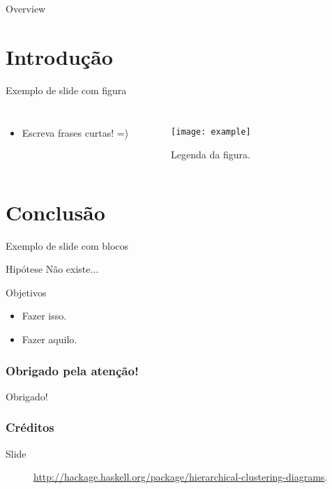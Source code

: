 
\begin{frame}
\titlepage
\end{frame}

\begin{frame}{Overview}
  \tableofcontents
\end{frame}

\section{Introdução}

\begin{frame}{Exemplo de slide com figura}
  \begin{columns}
    \begin{itemize}
    \item Escreva frases curtas! =)
    \end{itemize}

    \begin{figure}
      \texttt{[image: example]}
      \caption{Legenda da figura.}
      \label{fig:exemplo}
    \end{figure}
  \end{columns}
\end{frame}

\section{Conclusão}

\begin{frame}{Exemplo de slide com blocos}
  \begin{block}{Hipótese}
    Não existe...
  \end{block}

  \begin{block}{Objetivos}
    \begin{itemize}
    \item Fazer isso.
    \item Fazer aquilo.
    \end{itemize}
  \end{block}
\end{frame}

\appendix

\begin{frame}
  \frametitle{Obrigado pela atenção!}
  \begin{center}
    {\Huge Obrigado!}
  \end{center}
\end{frame}

\begin{frame}[allowframebreaks]
  \frametitle{Créditos}
  \begin{description}
  \item[Slide~\pageref{fig:exemplo}]
    \url{http://hackage.haskell.org/package/hierarchical-clustering-diagrams}.
  \end{description}
\end{frame}
